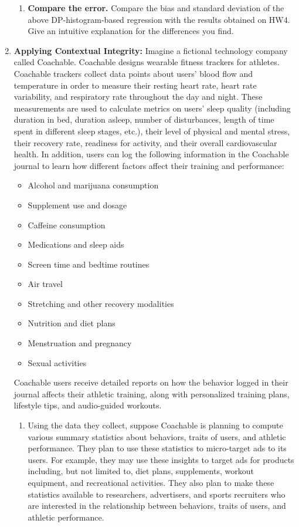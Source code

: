 \documentclass[11pt]{article}
\begin{document}
\begin{enumerate}[leftmargin=*]
\begin{enumerate}
            \item \textbf{Compare the error.} 
            Compare the bias and standard deviation of the above DP-histogram-based regression with the results obtained on HW4. 
            Give an intuitive explanation for the differences you find.
        \end{enumerate}
        
\item \textbf{Applying Contextual Integrity:} Imagine a fictional technology company called Coachable. Coachable designs wearable fitness trackers for athletes. Coachable trackers collect data points about users’ blood flow and temperature in order to measure their resting heart rate, heart rate variability, and respiratory rate throughout the day and night. These measurements are used to calculate metrics on users’ sleep quality (including duration in bed, duration asleep, number of disturbances, length of time spent in different sleep stages, etc.), their level of physical and mental stress, their recovery rate, readiness for activity, and their overall cardiovascular health. 
In addition, users can log the following information in the Coachable journal to learn how different factors affect their training and performance: 

\begin{itemize}
    \item Alcohol and marijuana consumption 
    \item Supplement use and dosage 
    \item Caffeine consumption 
    \item Medications and sleep aids 
    \item Screen time and bedtime routines
    \item Air travel 
    \item Stretching and other recovery modalities 
    \item Nutrition and diet plans 
    \item Menstruation and pregnancy
    \item Sexual activities
\end{itemize}

Coachable users receive detailed reports on how the behavior logged in their journal affects their athletic training, along with personalized training plans, lifestyle tips, and audio-guided workouts.

\begin{enumerate}
    \item Using the data they collect, suppose Coachable is planning to compute various summary statistics about behaviors, traits of users, and athletic performance. They plan to use these statistics to micro-target ads to its users. For example, they may use these insights to target ads for products including, but not limited to, diet plans, supplements, workout equipment, and recreational activities. They also plan to make these statistics available to researchers, advertisers, and sports recruiters who are interested in the relationship between behaviors, traits of users, and athletic performance.
    

\end{enumerate}
\end{enumerate}
\end{document}
